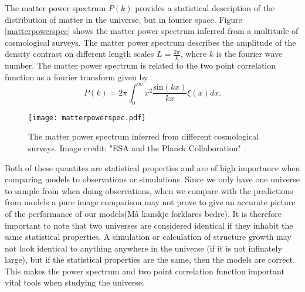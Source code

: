 The matter power spectrum $P(k)$ provides a statistical description of the
distribution of matter in the universe, but in fourier space. Figure
\ref{matterpowerspec} shows the matter power spectrum inferred from a multitude
of cosmological surveys. The matter power spectrum describes the amplitude of 
the density contrast on different length scales $L=\frac{2\pi}{k}$, where $k$ is
the fourier wave number. The matter power spectrum is related to the two point
correlation function as a fourier transform given by
\begin{equation}
    P(k)=2\pi\int_0^\infty x^2\frac{\mathrm{sin}(kx)}{kx}\xi(x)dx.
\end{equation}
\begin{figure}[htbp]\label{fig:matterpowerspec}
    \texttt{[image: matterpowerspec.pdf]}
    \caption{The matter power spectrum inferred from different cosmological surveys. Image credit: "ESA and the Planck Collaboration" \cite{2020}.}
\end{figure}
Both of these quantites are statistical properties and are of high importance
when comparing models to observations or simulations. Since we only have one
universe to sample from when doing observations, when we compare with the
predictions from models a pure image comparison may not prove to give an
accurate picture of the performance of our models(Må kanskje forklares bedre). It is therefore important to
note that two universes are considered identical if they inhabit the same
statistical properties. A simulation or calculation of structure growth may
not look identical to anything anywhere in the universe (if it is not infinately
large), but if the statistical properties are the same, then the models are
correct. This makes the power spectrum and two point correlation function
important vital tools when studying the universe.
